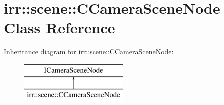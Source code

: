 \hypertarget{classirr_1_1scene_1_1_c_camera_scene_node}{\section{irr\-:\-:scene\-:\-:C\-Camera\-Scene\-Node Class Reference}
\label{classirr_1_1scene_1_1_c_camera_scene_node}
}
Inheritance diagram for irr\-:\-:scene\-:\-:C\-Camera\-Scene\-Node\-:\begin{figure}[H]
\begin{center}
\leavevmode
\includegraphics[height=2.000000cm]{classirr_1_1scene_1_1_c_camera_scene_node}
\end{center}
\end{figure}
